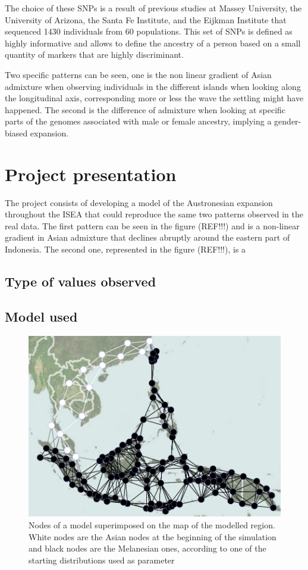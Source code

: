 \documentclass[a4paper,12pt]{report}
\begin{document}
The choice of these SNPs is a result of previous studies at Massey University, the University of Arizona, the Santa Fe Institute, and the Eijkman Institute that sequenced 1430 individuals from 60 populations. This set of SNPs is defined as highly informative and allows to define the ancestry of a person based on a small quantity of markers that are highly discriminant.

Two specific patterns can be seen, one is the non linear gradient of Asian admixture when observing individuals in the different islands when looking along the longitudinal axis, corresponding more or less the wave the settling might have happened. The second is the difference of admixture when looking at specific parts of the genomes associated with male or female ancestry, implying a gender-biased expansion.


\chapter{Project presentation}
The project consists of developing a model of the Austronesian expansion throughout the ISEA that could reproduce the same two patterns observed in the real data.
The first pattern can be seen in the figure (REF!!!) and is a non-linear gradient in Asian admixture that declines abruptly around the eastern part of Indonesia. The second one, represented in the figure (REF!!!), is a 

\section{Type of values observed}

\section{Model used}
\begin{figure}[h]
	\centering
	\includegraphics[scale=0.45]{../data/ISEA-node-map.png}
	\caption{Nodes of a model superimposed on the map of the modelled region. White nodes are the Asian nodes at the beginning of the simulation and black nodes are the Melanesian ones, according to one of the starting distributions used as parameter}
	\label{nodesOnMap}
\end{figure}
\end{document}
